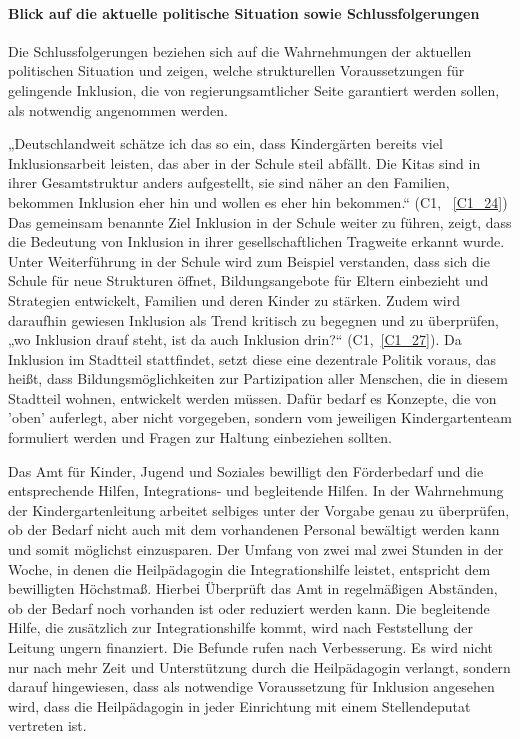 \paragraph{Blick auf die aktuelle politische Situation sowie Schlussfolgerungen}

Die Schlussfolgerungen beziehen sich auf die Wahrnehmungen der aktuellen politischen Situation und zeigen, welche strukturellen Voraussetzungen für gelingende Inklusion, die von regierungsamtlicher Seite garantiert werden sollen, als notwendig angenommen werden.
 
„Deutschlandweit schätze ich das so ein, dass Kindergärten bereits viel Inklusionsarbeit leisten, das aber in der Schule steil abfällt. Die Kitas sind in ihrer Gesamtstruktur anders aufgestellt, sie sind näher an den Familien, bekommen Inklusion eher hin und wollen es eher hin bekommen.“ (C1, ~\ref{C1_24}) Das gemeinsam benannte Ziel  Inklusion in der Schule weiter zu führen, zeigt, dass die Bedeutung von Inklusion in ihrer gesellschaftlichen Tragweite erkannt wurde. Unter Weiterführung in der Schule wird zum Beispiel verstanden, dass sich die Schule für neue Strukturen öffnet, Bildungsangebote für Eltern einbezieht und Strategien entwickelt, Familien und deren Kinder zu stärken. Zudem wird daraufhin gewiesen Inklusion als Trend kritisch zu begegnen und zu überprüfen, „wo Inklusion drauf steht, ist da auch Inklusion drin?“ (C1,~\ref{C1_27}). 
Da Inklusion im Stadtteil stattfindet, setzt diese eine dezentrale Politik voraus, das heißt, dass Bildungsmöglichkeiten zur Partizipation aller Menschen, die in diesem Stadtteil wohnen, entwickelt werden müssen. Dafür bedarf es Konzepte, die von 'oben' auferlegt, aber nicht vorgegeben, sondern vom jeweiligen Kindergartenteam formuliert werden und Fragen zur Haltung einbeziehen sollten.

Das Amt für Kinder, Jugend und Soziales bewilligt den Förderbedarf und die entsprechende Hilfen, Integrations- und begleitende Hilfen. In der Wahrnehmung der Kindergartenleitung arbeitet selbiges unter der Vorgabe genau zu überprüfen, ob der Bedarf nicht auch mit dem vorhandenen Personal bewältigt werden kann und somit möglichst einzusparen. Der Umfang von zwei mal zwei Stunden in der Woche, in denen die Heilpädagogin die Integrationshilfe leistet, entspricht dem  bewilligten Höchstmaß. Hierbei Überprüft das Amt in regelmäßigen Abständen, ob der Bedarf noch vorhanden ist oder reduziert werden kann. Die begleitende Hilfe, die zusätzlich zur Integrationshilfe kommt, wird nach Feststellung der Leitung ungern finanziert. Die Befunde rufen nach Verbesserung. Es wird nicht nur nach mehr Zeit und Unterstützung durch die Heilpädagogin verlangt, sondern darauf hingewiesen, dass als notwendige Voraussetzung für Inklusion angesehen wird, dass die Heilpädagogin in jeder Einrichtung mit einem Stellendeputat vertreten ist. 

